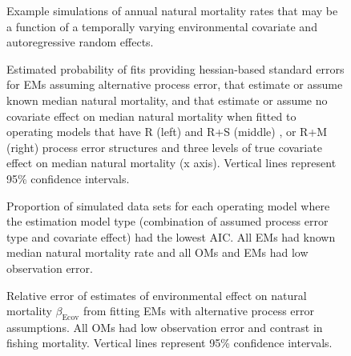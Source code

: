 \documentclass[
  12pt,
]{article}
\begin{document}
\begin{landscape}
\begin{figure}
\caption{Example simulations of annual natural mortality rates that may be a function of a temporally varying environmental covariate and autoregressive random effects.}\label{M_example}
\begin{center}
\end{center}
\end{figure}
\end{landscape}

\begin{landscape}
\begin{figure}
\begin{center}
\end{center}
\caption{Estimated probability of fits providing hessian-based standard errors for EMs assuming alternative process error, that estimate or assume known median natural mortality, and that estimate or assume no covariate effect on median natural mortality when fitted to operating models that have R (left) and R+S (middle) , or R+M (right) process error structures and three levels of true covariate effect on median natural mortality (x axis). Vertical lines represent 95\% confidence intervals.}\label{convergence}
\end{figure}
\end{landscape}

\begin{landscape}
\begin{figure}
\begin{center}
\end{center}
\caption{Proportion of simulated data sets for each operating model where the estimation model type (combination of assumed process error type and covariate effect) had the lowest AIC. All EMs had known median natural mortality rate and all OMs and EMs had low observation error.}\label{aic}
\end{figure}
\end{landscape}

\begin{landscape}
\begin{figure}
\begin{center}
\end{center}
\caption{Relative error of estimates of environmental effect on natural mortality $\beta_\text{Ecov}$ from fitting EMs with alternative process error assumptions. All OMs had low observation error and contrast in fishing mortality. Vertical lines represent 95\% confidence intervals.}\label{ecov_beta_bias}
\end{figure}
\end{landscape}
\end{document}
